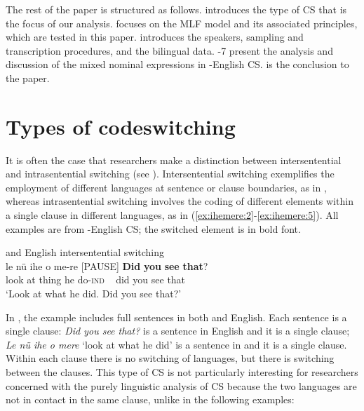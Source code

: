\documentclass[output=paper]{langsci/langscibook}
\begin{document}
\largerpage
The rest of the paper is structured as follows.  introduces the type of CS that is the focus of our analysis.  focuses on the MLF model and its associated principles, which are tested in this paper.  introduces the speakers, sampling and transcription procedures, and the bilingual data. -7 present the analysis and discussion of the mixed nominal expressions in -English CS.  is the conclusion to the paper.  

\section{Types of codeswitching}\label{sec:ihemere:2}

It is often the case that researchers make a distinction between intersentential and intrasentential switching (see \citealt{Clyne2003}). Intersentential switching exemplifies the employment of different languages at sentence or clause boundaries, as in , whereas intrasentential switching involves the coding of different elements within a single clause in different languages, as in (\ref{ex:ihemere:2}-\ref{ex:ihemere:5}). All examples are from -English CS; the switched element is in bold font.

\ea\label{ex:ihemere:1}
{ and English intersentential switching\rmfnm{}}\\
\gll le    nü  ihe  o   me-re    		[PAUSE] \textbf{Did} \textbf{you} \textbf{see} \textbf{that}?\\
     look  at  thing  he do-\textsc{ind}        ~         did  you see that\\
\glt ‘Look at what he did. Did you see that?’
\z
{}


In , the example includes full sentences in both  and English. Each sentence is a single clause:  \textit{Did you see that?} is a sentence in English and it is a single clause; \textit{Le nü ihe o mere} ‘look at what he did’ is a sentence in  and it is a single clause. Within each clause there is no switching of languages, but there is switching between the clauses. This type of CS is not particularly interesting for researchers concerned with the purely linguistic analysis of CS because the two languages are not in contact in the same clause, unlike in the following examples:
\end{document}
